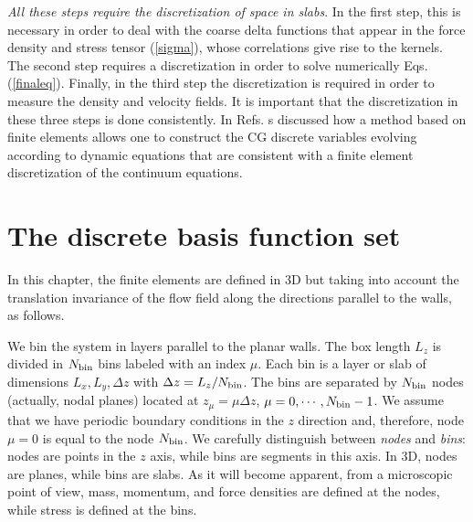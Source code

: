 \documentclass[b5paper,openright,11pt]{book}
\begin{document}
\textit{All  these  steps  require  the  discretization  of  space  in
  slabs}. In the  first step, this is necessary in  order to deal with
the coarse delta functions that appear  in the force density and stress
  tensor (\ref{sigma}), whose correlations give  rise to the kernels. The
second step  requires a discretization  in order to  solve numerically
Eqs.  (\ref{finaleq}).  Finally, in  the third step the discretization
is required in  order to measure the density and  velocity fields.  It
is  important that  the discretization  in these  three steps  is done
consistently. In Refs. \cite{DelaTorre2015,EspanolDonev2015} s discussed how  a method based
on  finite elements  allows one  to construct  the  CG discrete  variables
evolving according  to dynamic  equations that  are consistent  with a
finite  element  discretization of  the  continuum  equations. 


\section{The discrete basis function set}
\label{Sec:DiscreteBasis}
In this chapter, the finite elements are defined in 3D but taking into account the
translation invariance of the flow field along the directions parallel to the walls, as follows.

We bin  the system  in layers  parallel to the  planar walls.   The box
length $L_z$ is  divided in $N_{\rm bin}$ bins labeled  with an index
$\mu$.  Each bin  is a layer or slab of  dimensions $L_x,L_y,\Delta z$
with $\Delta  z=L_z/N_{\rm bin}$.  The  bins are separated  by $N_{\rm
  bin}$ nodes  (actually, nodal  planes) located at  $z_\mu=\mu \Delta
z$,  $\mu=0,\cdots,N_{\rm bin}-1$.   We assume  that we  have periodic
boundary  conditions  in  the  $z$ direction  and,  therefore,  node
$\mu=0$ is equal to the  node $N_{\rm bin}$.  We carefully distinguish
between \textit{nodes} and \textit{bins}: nodes  are points in the $z$
axis, while bins are segments in  this axis.  In 3D, nodes are planes,
while bins are slabs.  As it  will become apparent, from a microscopic
point of view, mass, momentum, and  force densities are defined at the
nodes, while stress is defined at the bins.
\end{document}
